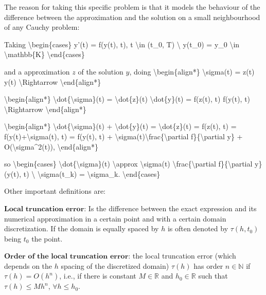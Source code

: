 \documentclass[letterpaper,10pt,english]{jupyterBook}
\begin{document}
\sphinxAtStartPar
The reason for taking this specific problem is that it models the behaviour of the difference between the approximation and the solution on a small neighbourhood of any Cauchy problem:

\sphinxAtStartPar
Taking
\textbackslash{}begin\{cases\}
y’(t) = f(y(t), t), t \textbackslash{}in (t\_0, T) \textbackslash{}
y(t\_0) = y\_0 \textbackslash{}in \textbackslash{}mathbb\{K\}
\textbackslash{}end\{cases\}

\sphinxAtStartPar
and a approximation \(z\) of the solution \(y\), doing
\textbackslash{}begin\{align*\}
\textbackslash{}sigma(t) = z(t) \sphinxhyphen{} y(t) \textbackslash{}Rightarrow
\textbackslash{}end\{align*\}

\sphinxAtStartPar
\textbackslash{}begin\{align*\}
\textbackslash{}dot\{\textbackslash{}sigma\}(t) = \textbackslash{}dot\{z\}(t) \sphinxhyphen{} \textbackslash{}dot\{y\}(t) = f(z(t), t) \sphinxhyphen{} f(y(t), t) \textbackslash{}Rightarrow
\textbackslash{}end\{align*\}

\sphinxAtStartPar
\textbackslash{}begin\{align*\}
\textbackslash{}dot\{\textbackslash{}sigma\}(t) + \textbackslash{}dot\{y\}(t) = \textbackslash{}dot\{z\}(t) = f(z(t), t) = f(y(t)+\textbackslash{}sigma(t), t) = f(y(t), t) + \textbackslash{}sigma(t)\textbackslash{}frac\{\textbackslash{}partial f\}\{\textbackslash{}partial y\} + O(\textbackslash{}sigma\textasciicircum{}2(t)),
\textbackslash{}end\{align*\}

\sphinxAtStartPar
so
\textbackslash{}begin\{cases\}
\textbackslash{}dot\{\textbackslash{}sigma\}(t) \textbackslash{}approx \textbackslash{}sigma(t) \textbackslash{}frac\{\textbackslash{}partial f\}\{\textbackslash{}partial y\} (y(t), t) \textbackslash{}
\textbackslash{}sigma(t\_k) = \textbackslash{}sigma\_k.
\textbackslash{}end\{cases\}

\sphinxAtStartPar
Other important definitions are:

\sphinxAtStartPar
\(\textbf{Local truncation error:}\) Is the difference between the exact expression and its numerical approximation in a certain point and with a certain domain discretization. If the domain is equally spaced by \(h\) is often denoted by \(\tau(h,t_0)\) being \(t_0\) the point.

\sphinxAtStartPar
\(\textbf{Order of the local truncation error:}\) the local truncation error (which depends on the \(h\) spacing of the discretized domain) \(\tau(h)\) has order \(n \in \mathbb{N}\) if \(\tau(h) = O(h^n) \), i.e., if there is constant \(M \in \mathbb{R}\) and \(h_0 \in \mathbb{R}\) such that \(\tau(h) \leq M h^n\), \(\forall h \leq h_0\).
\end{document}
